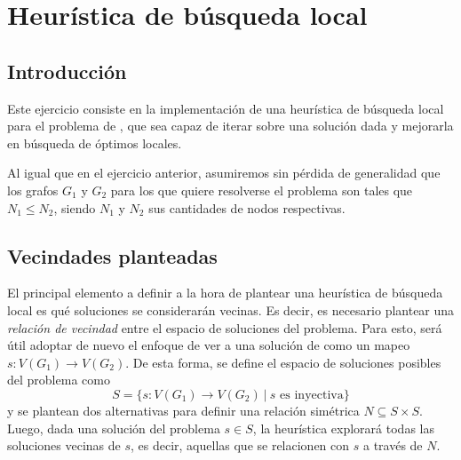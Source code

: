\section{Heurística de búsqueda local}


\subsection{Introducción}
Este ejercicio consiste en la implementación de una heurística de búsqueda
local para el problema de , que sea capaz de iterar sobre una
solución dada y mejorarla en búsqueda de óptimos locales.

Al igual que en el ejercicio anterior, asumiremos sin pérdida de generalidad
que los grafos $G_1$ y $G_2$ para los que quiere resolverse el problema son
tales que $N_1 \leq N_2$, siendo $N_1$ y $N_2$ sus cantidades de nodos
respectivas.

\subsection{Vecindades planteadas}

El principal elemento a definir a la hora de plantear una heurística de
búsqueda local es qué soluciones se considerarán vecinas. Es decir, es
necesario plantear una \emph{relación de vecindad} entre el espacio de
soluciones del problema. Para esto, será útil adoptar de nuevo el enfoque
de ver a una solución de  como un mapeo $s : V(G_1) \to V(G_2)$.
De esta forma, se define el espacio de soluciones posibles del problema como
\[ S = \lbrace s : V(G_1) \to V(G_2) \ \vert\ s \text{ es inyectiva}
\rbrace \]
y se plantean dos alternativas para definir una relación simétrica $N
\subseteq S \times S$.
Luego, dada una solución del problema $s \in S$, la heurística
explorará todas las soluciones vecinas de $s$, es decir, aquellas que se
relacionen con $s$ a través de $N$.

